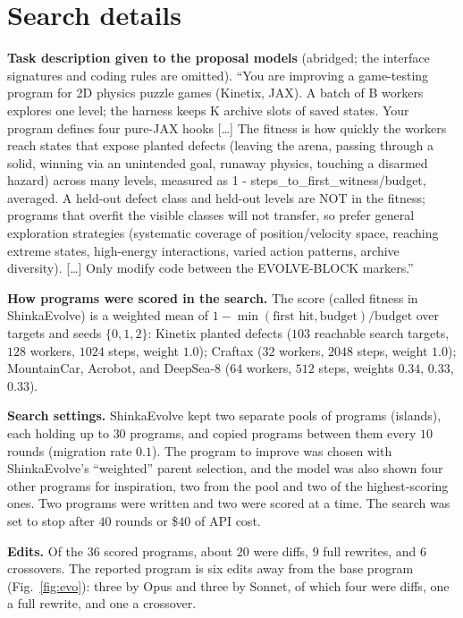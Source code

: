 \documentclass{article}
\begin{document}
\section{Search details}
\label{app:search}
\textbf{Task description given to the proposal models} (abridged; the interface signatures and coding rules are
omitted). ``You are improving a game-testing program for 2D physics puzzle games (Kinetix, JAX). A batch of B workers
explores one level; the harness keeps K archive slots of saved states. Your program defines four pure-JAX hooks [\ldots]
The fitness is how quickly the workers reach states that expose planted defects (leaving the arena, passing through a
solid, winning via an unintended goal, runaway physics, touching a disarmed hazard) across many levels, measured as
1 - steps\_to\_first\_witness/budget, averaged. A held-out defect class and held-out levels are NOT in the fitness; programs
that overfit the visible classes will not transfer, so prefer general exploration strategies (systematic coverage of
position/velocity space, reaching extreme states, high-energy interactions, varied action patterns, archive diversity).
[\ldots] Only modify code between the EVOLVE-BLOCK markers.''

\textbf{How programs were scored in the search.} The score (called fitness in ShinkaEvolve) is a weighted mean of $1-\min(\text{first hit},\text{budget})/\text{budget}$ over
targets and seeds $\{0,1,2\}$: Kinetix planted defects ($103$ reachable search targets, $128$ workers, $1024$ steps,
weight $1.0$); Craftax ($32$ workers, $2048$ steps, weight $1.0$); MountainCar, Acrobot, and DeepSea-8 ($64$ workers,
$512$ steps, weights $0.34$, $0.33$, $0.33$).

\textbf{Search settings.} ShinkaEvolve kept two separate pools of programs (islands), each holding up to $30$ programs,
and copied programs between them every $10$ rounds (migration rate $0.1$). The program to improve was chosen with
ShinkaEvolve's ``weighted'' parent selection, and the model was also shown four other programs for inspiration, two
from the pool and two of the highest-scoring ones. Two programs were written and two were scored at a time. The search
was set to stop after $40$ rounds or \$$40$ of API cost.

\textbf{Edits.} Of the $36$ scored programs, about $20$ were diffs, $9$ full rewrites, and $6$ crossovers. The reported
program is six edits away from the base program (Fig.~\ref{fig:evo}): three by Opus and three by Sonnet, of which
four were diffs, one a full rewrite, and one a crossover.
\end{document}
